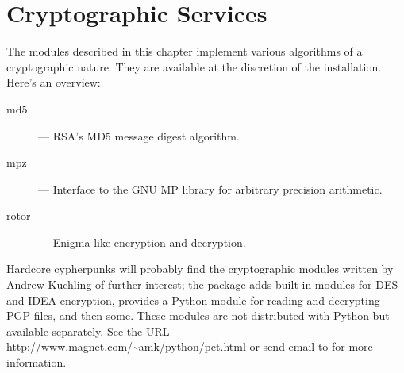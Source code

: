 \chapter{Cryptographic Services}

The modules described in this chapter implement various algorithms of
a cryptographic nature.  They are available at the discretion of the
installation.  Here's an overview:

\begin{description}

\item[md5]
--- RSA's MD5 message digest algorithm.

\item[mpz]
--- Interface to the GNU MP library for arbitrary precision arithmetic.

\item[rotor]
--- Enigma-like encryption and decryption.

\end{description}

Hardcore cypherpunks will probably find the cryptographic modules
written by Andrew Kuchling of further interest; the package adds
built-in modules for DES and IDEA encryption, provides a Python module
for reading and decrypting PGP files, and then some.  These modules
are not distributed with Python but available separately.  See the URL
\url{http://www.magnet.com/\~amk/python/pct.html} or send email to
 for more information.
